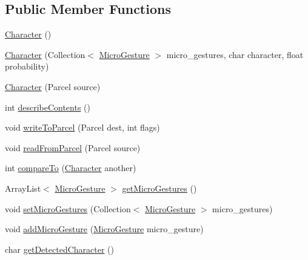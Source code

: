 \subsection*{Public Member Functions}
\begin{DoxyCompactItemize}
\item 
\hyperlink{classch_1_1zhaw_1_1ba10__bsha__1_1_1Character_a4767949d8c182759546593cedbfa2fca}{Character} ()
\item 
\hyperlink{classch_1_1zhaw_1_1ba10__bsha__1_1_1Character_a7de6941f30f53be346af22a76e8dd455}{Character} (Collection$<$ \hyperlink{classch_1_1zhaw_1_1ba10__bsha__1_1_1service_1_1MicroGesture}{MicroGesture} $>$ micro\_\-gestures, char character, float probability)
\item 
\hyperlink{classch_1_1zhaw_1_1ba10__bsha__1_1_1Character_a9610139b4634b1f6c33ed5a5fa91ba0f}{Character} (Parcel source)
\item 
int \hyperlink{classch_1_1zhaw_1_1ba10__bsha__1_1_1Character_ae64eef9831bfc6a36a46711512f031a3}{describeContents} ()
\item 
void \hyperlink{classch_1_1zhaw_1_1ba10__bsha__1_1_1Character_ab8b193814ae930d7ee870d11ec3ae788}{writeToParcel} (Parcel dest, int flags)
\item 
void \hyperlink{classch_1_1zhaw_1_1ba10__bsha__1_1_1Character_ad3676c8beb543679a81599fa69bb447d}{readFromParcel} (Parcel source)
\item 
int \hyperlink{classch_1_1zhaw_1_1ba10__bsha__1_1_1Character_a66cd28da88720aba5b7a441326874e65}{compareTo} (\hyperlink{classch_1_1zhaw_1_1ba10__bsha__1_1_1Character}{Character} another)
\item 
ArrayList$<$ \hyperlink{classch_1_1zhaw_1_1ba10__bsha__1_1_1service_1_1MicroGesture}{MicroGesture} $>$ \hyperlink{classch_1_1zhaw_1_1ba10__bsha__1_1_1Character_a5db74fce6f0c14edd6eb3e4a693ad689}{getMicroGestures} ()
\item 
void \hyperlink{classch_1_1zhaw_1_1ba10__bsha__1_1_1Character_ab1a6cfeef0de8bca6e97e79b65320978}{setMicroGestures} (Collection$<$ \hyperlink{classch_1_1zhaw_1_1ba10__bsha__1_1_1service_1_1MicroGesture}{MicroGesture} $>$ micro\_\-gestures)
\item 
void \hyperlink{classch_1_1zhaw_1_1ba10__bsha__1_1_1Character_a6f61da3106a54f30d804c9e4d5b03b9c}{addMicroGesture} (\hyperlink{classch_1_1zhaw_1_1ba10__bsha__1_1_1service_1_1MicroGesture}{MicroGesture} micro\_\-gesture)
\item 
char \hyperlink{classch_1_1zhaw_1_1ba10__bsha__1_1_1Character_a2bcee4a4f8ab32a78d3a8d2885795c16}{getDetectedCharacter} ()

\end{DoxyCompactItemize}
